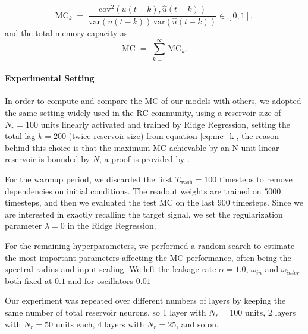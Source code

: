 \begin{equation}
\mathrm{MC}_k \;=\; \frac{\mathrm{cov}^2\!\left(u(t-k),\hat{u}(t-k)\right)}{\mathrm{var}\!\left(u(t-k)\right)\,\mathrm{var}\!\left(\hat{u}(t-k)\right)} \in [0,1],
\end{equation}
and the total memory capacity as
\begin{equation}
\mathrm{MC} \;=\; \sum_{k=1}^{\infty} \mathrm{MC}_k.
\label{eq:mc_k}
\end{equation}

\paragraph{Experimental Setting}
In order to compute and compare the MC of our models with others, we adopted the same setting widely used in the RC community, using a reservoir size of $N_{r}=100$ units linearly activated and trained by Ridge Regression, 
setting the total lag $k=200$ (twice reservoir size) from equation \ref{eq:mc_k}, the reason behind this choice is that the maximum
MC achievable by an N-unit linear reservoir is bounded by $N$, a proof is provided by \cite[Proposition 2.]{memorycapacity}.

For the warmup period, we discarded the first $T_{\mathrm{wash}}=100$ timesteps to remove dependencies on initial conditions.  
The readout weights are trained on $5000$ timesteps, and then we evaluated the test MC on the last $900$ timesteps.
Since we are interested in exactly recalling the target signal, we set the regularization parameter $\lambda=0$ in the Ridge Regression.

For the remaining hyperparameters, we performed a random search to estimate the most important parameters affecting the MC performance, often
being the spectral radius and input scaling. We left the leakage rate $\alpha = 1.0$, $\omega_{in}$ and $\omega_{inter}$ both fixed at $0.1$ and for oscillators $0.01$

Our experiment was repeated over different numbers of layers by keeping the same number of total reservoir neurons, so 1 layer with $N_{r}=100$ units, 2 layers with $N_{r}=50$ units each, 4 layers with $N_{r}=25$, and so on.



